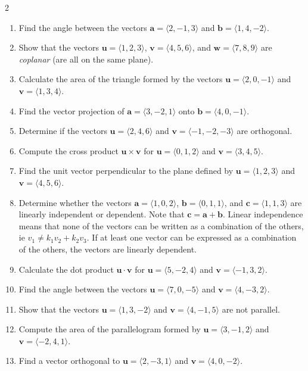 \begin{multicols}{2}
\begin{enumerate}
    \item Find the angle between the vectors \( \mathbf{a} = \langle 2, -1, 3 \rangle \) and \( \mathbf{b} = \langle 1, 4, -2 \rangle \).
    \item Show that the vectors \( \mathbf{u} = \langle 1, 2, 3 \rangle \), \( \mathbf{v} = \langle 4, 5, 6 \rangle \), and \( \mathbf{w} = \langle 7, 8, 9 \rangle \) are \textit{coplanar} (are all on the same plane).
    \item Calculate the area of the triangle formed by the vectors \( \mathbf{u} = \langle 2, 0, -1 \rangle \) and \( \mathbf{v} = \langle 1, 3, 4 \rangle \).
    \item Find the vector projection of \( \mathbf{a} = \langle 3, -2, 1 \rangle \) onto \( \mathbf{b} = \langle 4, 0, -1 \rangle \).
    \item Determine if the vectors \( \mathbf{u} = \langle 2, 4, 6 \rangle \) and \( \mathbf{v} = \langle -1, -2, -3 \rangle \) are orthogonal.
    \item Compute the cross product \( \mathbf{u} \times \mathbf{v} \) for \( \mathbf{u} = \langle 0, 1, 2 \rangle \) and \( \mathbf{v} = \langle 3, 4, 5 \rangle \).
    \item Find the unit vector perpendicular to the plane defined by \( \mathbf{u} = \langle 1, 2, 3 \rangle \) and \( \mathbf{v} = \langle 4, 5, 6 \rangle \).
\item Determine whether the vectors \( \mathbf{a} = \langle 1, 0, 2 \rangle \), \( \mathbf{b} = \langle 0, 1, 1 \rangle \), and \( \mathbf{c} = \langle 1, 1, 3 \rangle \) are linearly independent or dependent. Note that \( \mathbf{c} = \mathbf{a} + \mathbf{b} \). Linear independence means that none of the vectors can be written as a combination of the others, ie $v_1 \neq k_1 v_2 + k_2 v_3$. If at least one vector can be expressed as a combination of the others, the vectors are linearly dependent.
    \item Calculate the dot product \( \mathbf{u} \cdot \mathbf{v} \) for \( \mathbf{u} = \langle 5, -2, 4 \rangle \) and \( \mathbf{v} = \langle -1, 3, 2 \rangle \).
    \item Find the angle between the vectors \( \mathbf{u} = \langle 7, 0, -5 \rangle \) and \( \mathbf{v} = \langle 4, -3, 2 \rangle \).
    \item Show that the vectors \( \mathbf{u} = \langle 1, 3, -2 \rangle \) and \( \mathbf{v} = \langle 4, -1, 5 \rangle \) are not parallel.
    \item Compute the area of the parallelogram formed by \( \mathbf{u} = \langle 3, -1, 2 \rangle \) and \( \mathbf{v} = \langle -2, 4, 1 \rangle \).
    \item Find a vector orthogonal to \( \mathbf{u} = \langle 2, -3, 1 \rangle \) and \( \mathbf{v} = \langle 4, 0, -2 \rangle \).


\end{enumerate}
\end{multicols}
